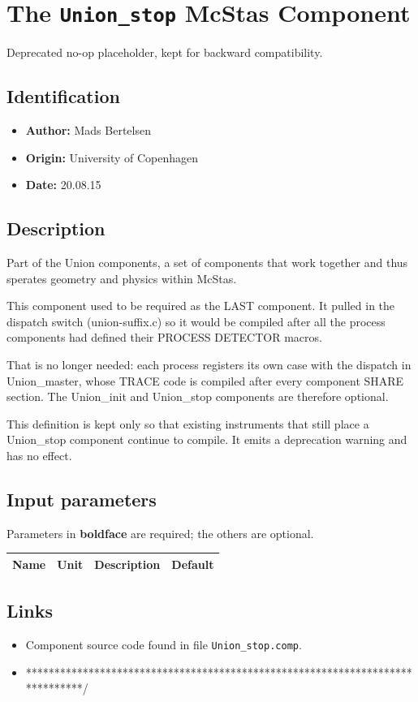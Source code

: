 \section{The \texttt{Union\_stop} McStas Component}
Deprecated no-op placeholder, kept for backward compatibility.

\subsection*{Identification}
\begin{itemize}
  \item \textbf{Author:} Mads Bertelsen
  \item \textbf{Origin:} University of Copenhagen
  \item \textbf{Date:} 20.08.15
\end{itemize}

\subsection*{Description}
Part of the Union components, a set of components that work together and thus sperates geometry and physics within McStas.

This component used to be required as the LAST component. It pulled in the dispatch switch (union-suffix.c) so it would be compiled after all the process components had defined their PROCESS DETECTOR macros.

That is no longer needed: each process registers its own case with the dispatch in Union\_master, whose TRACE code is compiled after every component SHARE section. The Union\_init and Union\_stop components are therefore optional.

This definition is kept only so that existing instruments that still place a Union\_stop component continue to compile. It emits a deprecation warning and has no effect.

\subsection*{Input parameters}
Parameters in \textbf{boldface} are required; the others are optional.

\begin{longtable}{p{}p{}p{}p{}}
\toprule
\textbf{Name} & \textbf{Unit} & \textbf{Description} & \textbf{Default} \\
\midrule
\endhead
\bottomrule
\end{longtable}

\subsection*{Links}
\begin{itemize}
  \item Component source code found in file \texttt{Union\_stop.comp}.
  \item ******************************************************************************/
\end{itemize}
